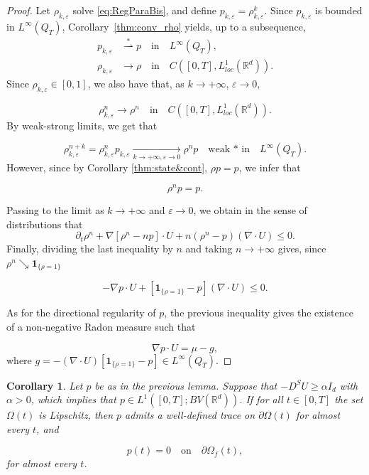 \documentclass[11pt,twoside]{article}
\numberwithin{equation}{section}
\newcommand{\R}{\mathbb{R}}
\newcommand {\eps}  {\varepsilon}
\newcommand {\f}   {\frac}
\newcommand {\p}   {\partial}
\newtheorem{corollary}[theorem]{Corollary}
\begin{document}
\begin{proof}
Let $\rho_{k,\eps}$ solve \eqref{eq:RegParaBis}, and define $p_{k,\eps}=\rho_{k,\eps}^k$. Since $p_{k,\eps}$ is bounded in $L^\infty(Q_T)$, Corollary~\ref{thm:conv_rho} yields, up to a subsequence,
\begin{align*}
p_{k,\eps} &\overset{\ast}{\rightharpoonup} p 
\quad \text{in} \quad L^{\infty}(Q_T),\\
\rho_{k,\eps} &\to \rho 
\quad \text{in} \quad C([0,T],L^1_{loc}(\R^d)).
\end{align*}
Since $\rho_{k,\eps} \in[0,1]$, we also have that, as $k \to +\infty$, $\eps \to0$, 

\[
\rho_{k,\eps}^n {\longrightarrow} \rho^n \quad \text{in} \quad C([0,T],L^1_{loc}(\R^d)).
\]
By weak-strong limits, we get that 

\[
\rho_{k,\eps}^{n+k} = \rho_{k,\eps}^n p_{k,\eps} \underset{k \to + \infty,\eps \to 0}{\longrightarrow} \rho^np \quad \text{weak * in} \quad L^\infty(Q_T).
\]
However, since by Corollary \ref{thm:state&cont}, $\rho p=p$, we infer that 

\[
\rho^n p = p.
\]

Passing to the limit as $k\to+\infty$ and $\eps\to0$, we obtain in the sense of distributions that
\[
\p_t \rho^n + \nabla \!\left[\rho^n-np\right]\cdot U+n(\rho^n-p)(\nabla\cdot U) \le 0.
\]
Finally, dividing the last inequality by $n$ and taking $n \to +\infty$ gives, since $\rho^n \searrow \mathbf{1}_{\{\rho = 1\}}$

\[
-\nabla p \cdot U + [\mathbf{1}_{\{\rho=1\}}-p](\nabla \cdot U) \le0.
\]

As for the directional regularity of $p$, the previous inequality gives the existence of a non-negative Radon measure such that

\[
\nabla p\cdot U = \mu-g,
\]
where $g = -(\nabla \cdot U)[\mathbf{1}_{\{\rho=1\}}-p] \in L^\infty(Q_T)$.


\end{proof}

\begin{corollary}
\label{thm:boundary_condition}
Let $p$ be as in the previous lemma. Suppose that $-D^SU \ge \alpha I_d$ with $\alpha >0$, which implies that $p \in L^1([0,T];BV(\R^d))$.
If for all $t\in[0,T]$ the set $\Omega(t)$ is Lipschitz, then 
$p$ admits a well-defined trace on $\partial\Omega(t)$ 
for almost every $t$, and 

\[
p(t)=0 \quad \text{on} \quad\partial\Omega_f(t),
\]
for almost every $t$.
\end{corollary}
\end{document}
